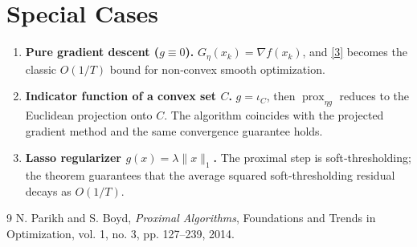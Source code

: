 \documentclass{article}
\begin{document}
\section*{Special Cases}
\begin{enumerate}[nosep]
\item \textbf{Pure gradient descent ($g\equiv0$).}  $G_{\eta}(x_{k})=\nabla f(x_{k})$, and \eqref{3} becomes the classic $O(1/T)$ bound for non‑convex smooth optimization.
\item \textbf{Indicator function of a convex set $C$.}  $g=\iota_{C}$, then $\operatorname{prox}_{\eta g}$ reduces to the Euclidean projection onto $C$.  The algorithm coincides with the projected gradient method and the same convergence guarantee holds.
\item \textbf{Lasso regularizer $g(x)=\lambda\|x\|_{1}$.}  The proximal step is soft‑thresholding; the theorem guarantees that the average squared soft‑thresholding residual decays as $O(1/T)$.
\end{enumerate}

\begin{thebibliography}{9}
N. Parikh and S. Boyd, \emph{Proximal Algorithms}, Foundations and Trends in Optimization, vol. 1, no. 3, pp. 127–239, 2014.
\end{thebibliography}
\end{document}
